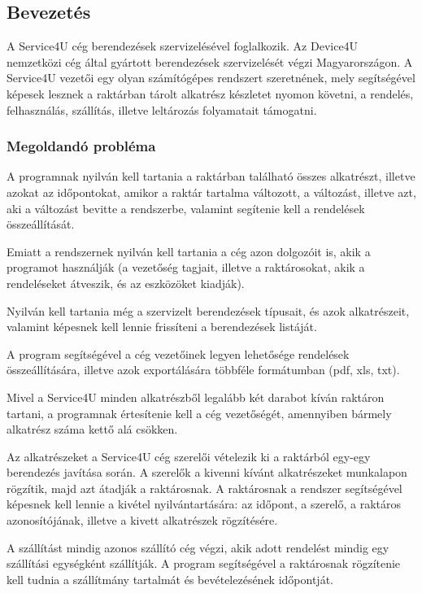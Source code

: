 \documentclass[12pt]{article}\usepackage[left=20mm,right=20mm,top=14mm,bottom=20mm]{geometry}
\begin{document}
\subsection{Bevezetés}
A Service4U cég berendezések szervizelésével foglalkozik. Az Device4U nemzetközi cég által
gyártott berendezések szervizelését végzi Magyarországon.
A Service4U vezetői egy olyan számítógépes rendszert szeretnének, mely segítségével képesek
lesznek a raktárban tárolt alkatrész készletet nyomon követni, a rendelés, felhasználás, szállítás, illetve
leltározás folyamatait támogatni.

\subsubsection{Megoldandó probléma}
A programnak nyilván kell tartania a raktárban található összes alkatrészt, illetve azokat az időpontokat, amikor a raktár tartalma változott, a változást, illetve azt, aki a változást bevitte a rendszerbe, valamint segítenie kell a rendelések összeállítását.

Emiatt a rendszernek nyilván kell tartania a cég azon dolgozóit is, akik a programot használják (a vezetőség tagjait, illetve a raktárosokat, akik a rendeléseket átveszik, és az eszközöket kiadják).

Nyilván kell tartania még a szervizelt berendezések típusait, és azok alkatrészeit, valamint képesnek kell lennie frissíteni a berendezések listáját.

A program segítségével a cég vezetőinek legyen lehetősége rendelések összeállítására, illetve azok exportálására többféle formátumban (pdf, xls, txt).
 
Mivel a Service4U minden alkatrészből legalább két darabot kíván raktáron tartani, a programnak értesítenie kell a cég vezetőségét, amennyiben bármely alkatrész száma kettő alá csökken.

Az alkatrészeket a Service4U cég szerelői vételezik ki a raktárból egy-egy berendezés javítása
során. 
A szerelők a kivenni kívánt alkatrészeket munkalapon rögzítik, majd azt átadják a raktárosnak. 
A raktárosnak a rendszer segítségével képesnek kell lennie a kivétel nyilvántartására: az időpont, a szerelő, a raktáros azonosítójának, illetve a kivett alkatrészek rögzítésére.

A szállítást mindig azonos szállító cég végzi, akik adott rendelést mindig egy szállítási egységként szállítják.
A program segítségével a raktárosnak rögzítenie kell tudnia a szállítmány tartalmát és bevételezésének időpontját.
\end{document}
